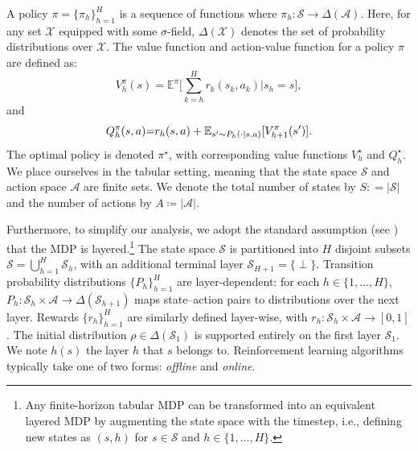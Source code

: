 \documentclass[twoside]{article}
\DeclarePairedDelimiter{\brk}{[}{]}
\begin{document}
A policy $\pi {=} \{\pi_h\}_{h=1}^H$ is a sequence of functions where $\pi_h: \mathcal{S} \to \Delta(\mathcal{A})$. Here, for any set $\mathcal{X}$ equipped with some $\sigma$-field, $\Delta(\mathcal{X})$ denotes the set of probability distributions over $\mathcal{X}$.
The value function and action-value function for a policy $\pi$ are defined as:
\[
V_h^\pi(s) {=} \mathbb{E}^\pi \bigg[ \sum_{k=h}^H r_k(s_k, a_k) \Big| s_h=s \bigg],
\]    
and
\[
 Q_h^\pi(s,a) {=} r_h(s,a) + \mathbb{E}_{s' \sim P_h(\cdot|s,a)} \brk{V_{h+1}^\pi(s')}. 
\]
The optimal policy is denoted $\pi^\star$, with corresponding value functions $V_h^\star$ and $Q_h^\star$.
We place ourselves in the tabular setting, meaning that the state space $\mathcal{S}$ and action space $\mathcal{A}$ are finite sets. We denote the total number of states by $S:{=} |\mathcal{S}|$ and the number of actions by $A \coloneq |\mathcal{A}|$.

Furthermore, to simplify our analysis, we adopt the standard assumption (see \cite{xu_fine-grained_2021, zhang_provably_2021}) that the MDP is layered.\footnote{Any finite-horizon tabular MDP can be transformed into an equivalent layered MDP by augmenting the state space with the timestep, i.e., defining new states as $(s,h)$ for $s \in \mathcal{S}$ and $h \in \lbrace 1,\dots,H\rbrace$.}
The state space $\mathcal{S}$ is partitioned into $H$ disjoint subsets $\mathcal{S} {=} \bigcup_{h=1}^{H} \mathcal{S}_h$, with an additional terminal layer $\mathcal{S}_{H+1}{=}\{\perp\}$. Transition probability distributions $\{P_h\}_{h=1}^H$ are layer-dependent: for each $h \in \{1,\dots,H\}$, $P_h:\mathcal{S}_h\times\mathcal{A}\to\Delta(\mathcal{S}_{h+1})$ maps state–action pairs to distributions over the next layer. Rewards $\{r_h\}_{h=1}^H$ are similarly defined layer-wise, with $r_h:\mathcal{S}_h\times\mathcal{A}\to[0,1]$. The initial distribution $\rho\in\Delta(\mathcal{S}_1)$ is supported entirely on the first layer $\mathcal S_1$. We note $h(s)$ the layer $h$ that $s$ belongs to. Reinforcement learning algorithms typically take one of two forms: \emph{offline} and \emph{online}.
\end{document}
